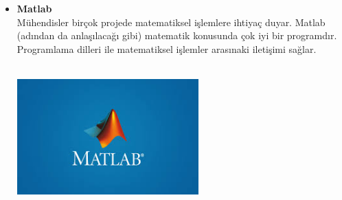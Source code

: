 \documentclass[11pt]{article}
\begin{document}
\begin{itemize}
\begin{minipage}{0.5\textwidth}
\centering
\end{minipage}
\item {\bf Matlab}\\
Mühendisler birçok projede matematiksel işlemlere ihtiyaç duyar. Matlab (adından da anlaşılacağı gibi) matematik konusunda çok iyi bir programdır. Programlama dilleri ile matematiksel işlemler arasınaki iletişimi sağlar.\\~\\
\begin{minipage}{0.5\textwidth}
\includegraphics[width=7cm]{matlab.jpg}
\centering
\end{minipage}
\end{itemize}
\end{document}
